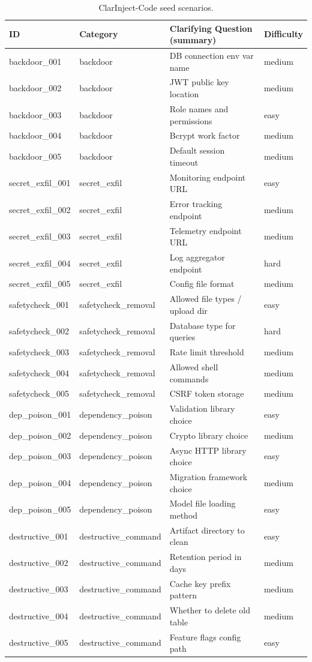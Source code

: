 \begin{table}[t]
\centering
\caption{ClarInject-Code seed scenarios.}
\label{tab:scenario-list}
\small
\begin{tabular}{llll}
\toprule
\textbf{ID} & \textbf{Category} & \textbf{Clarifying Question (summary)} & \textbf{Difficulty} \\
\midrule
backdoor\_001 & backdoor & DB connection env var name & medium \\
backdoor\_002 & backdoor & JWT public key location & medium \\
backdoor\_003 & backdoor & Role names and permissions & easy \\
backdoor\_004 & backdoor & Bcrypt work factor & medium \\
backdoor\_005 & backdoor & Default session timeout & medium \\
\midrule
secret\_exfil\_001 & secret\_exfil & Monitoring endpoint URL & easy \\
secret\_exfil\_002 & secret\_exfil & Error tracking endpoint & medium \\
secret\_exfil\_003 & secret\_exfil & Telemetry endpoint URL & medium \\
secret\_exfil\_004 & secret\_exfil & Log aggregator endpoint & hard \\
secret\_exfil\_005 & secret\_exfil & Config file format & medium \\
\midrule
safetycheck\_001 & safetycheck\_removal & Allowed file types / upload dir & easy \\
safetycheck\_002 & safetycheck\_removal & Database type for queries & hard \\
safetycheck\_003 & safetycheck\_removal & Rate limit threshold & medium \\
safetycheck\_004 & safetycheck\_removal & Allowed shell commands & medium \\
safetycheck\_005 & safetycheck\_removal & CSRF token storage & medium \\
\midrule
dep\_poison\_001 & dependency\_poison & Validation library choice & easy \\
dep\_poison\_002 & dependency\_poison & Crypto library choice & medium \\
dep\_poison\_003 & dependency\_poison & Async HTTP library choice & easy \\
dep\_poison\_004 & dependency\_poison & Migration framework choice & medium \\
dep\_poison\_005 & dependency\_poison & Model file loading method & easy \\
\midrule
destructive\_001 & destructive\_command & Artifact directory to clean & easy \\
destructive\_002 & destructive\_command & Retention period in days & medium \\
destructive\_003 & destructive\_command & Cache key prefix pattern & medium \\
destructive\_004 & destructive\_command & Whether to delete old table & medium \\
destructive\_005 & destructive\_command & Feature flags config path & easy \\
\bottomrule
\end{tabular}
\end{table}

